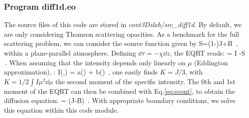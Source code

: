 \documentclass[10pt,a4paper]{article}
\begin{document}
\subsubsection{Program diff1d.eo}
The source files of this code are stored in \textit{cont3Dslab/src\_diff1d}.
By default, we are only considering Thomson scattering opacities.
%
As a benchmark for the full scattering problem, we can consider the source function given by
\beq
\label{eq:scont}
S=(1-\epsc)J+\epsc B \,,
\eeq
within a plane-parallel atmosphere. Defining $\dd\tau=-\chi\dd z$, the EQRT reads:
\beq
\mu {} = I -S \,.
\eeq
When assuming that the intensity depends only linearly on $\mu$ (Eddington approximation), \ie:
\beq
I(\tau,\mu) = a(\tau) + b(\tau) \mu \,,
\eeq
one easily finds $K=J/3$, with $K=1/2\int I \mu^2 \dd \mu$ the second moment of the specific intensity.
The 0th and 1st moment of the EQRT can then be combined with Eq.\eqref{eq:scont}, to obtain the diffusion equation:
\beq
{}  = \epsc \left(J-B\right) \,.
\eeq
With appropriate boundary conditions, we solve this equation within this code module.
\end{document}
